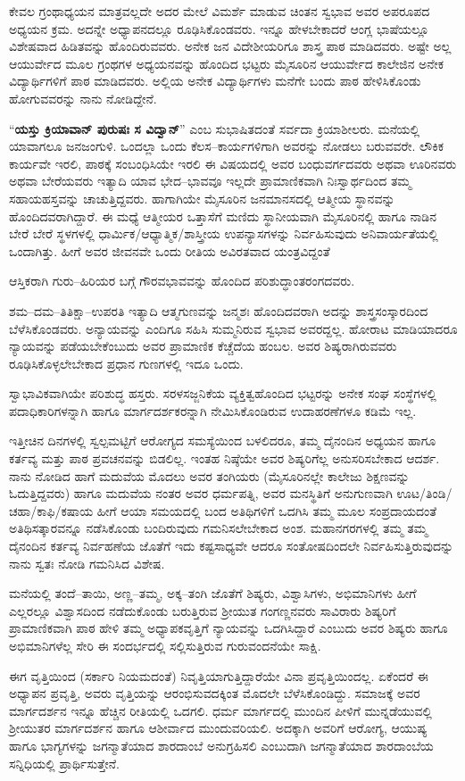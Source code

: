 ಕೇವಲ ಗ್ರಂಥಾಧ್ಯಯನ ಮಾತ್ರವಲ್ಲದೇ ಅದರ ಮೇಲೆ ವಿಮರ್ಶೆ ಮಾಡುವ ಚಿಂತನ ಸ್ವಭಾವ ಅವರ ಅಪರೂಪದ ಅಧ್ಯಯನ ಕ್ರಮ. ಅದನ್ನೇ ಅಧ್ಯಾಪನದಲ್ಲೂ ರೂಢಿಸಿಕೊಂಡವರು. ಇನ್ನೂ ಹೇಳಬೇಕಾದರೆ ಆಂಗ್ಲ ಭಾಷೆಯಲ್ಲೂ ವಿಶೇಷವಾದ ಹಿಡಿತವನ್ನು ಹೊಂದಿರುವವರು. ಅನೇಕ ಜನ ವಿದೇಶೀಯರಿಗೂ ಶಾಸ್ತ್ರ ಪಾಠ ಮಾಡಿದವರು. ಅಷ್ಟೇ ಅಲ್ಲ ಆಯುರ್ವೇದ ಮೂಲ ಗ್ರಂಥಗಳ ಅಧ್ಯಯನವನ್ನು ಹೊಂದಿದ ಭಟ್ಟರು ಮೈಸೂರಿನ ಆಯುರ್ವೇದ ಕಾಲೇಜಿನ ಅನೇಕ ವಿದ್ಯಾರ್ಥಿಗಳಿಗೆ ಪಾಠ ಮಾಡಿದವರು. ಅಲ್ಲಿಯ ಅನೇಕ ವಿದ್ಯಾರ್ಥಿಗಳು ಮನೆಗೇ ಬಂದು ಪಾಠ ಹೇಳಿಸಿಕೊಂಡು ಹೋಗುವವರನ್ನು ನಾನು ನೋಡಿದ್ದೇನೆ.

“\textbf{ಯಸ್ತು ಕ್ರಿಯಾವಾನ್ ಪುರುಷಃ ಸ ವಿದ್ವಾನ್}” ಎಂಬ ಸುಭಾಷಿತದಂತೆ ಸರ್ವದಾ ಕ್ರಿಯಾಶೀಲರು. ಮನೆಯಲ್ಲಿ ಯಾವಾಗಲೂ ಜನಜಂಗುಳಿ. ಒಂದಲ್ಲಾ ಒಂದು ಕೆಲಸ–ಕಾರ್ಯಗಳಿಗಾಗಿ ಅವರನ್ನು ನೋಡಲು ಬರುವವರೇ. ಲೌಕಿಕ ಕಾರ್ಯವೇ ಇರಲಿ, ಪಾಠಕ್ಕೆ ಸಂಬಂಧಿಸಿಯೇ ಇರಲಿ ಈ ವಿಷಯದಲ್ಲಿ ಅವರ ಬಂಧುವರ್ಗದವರು ಅಥವಾ ಊರಿನವರು ಅಥವಾ ಬೇರೆಯವರು ಇತ್ಯಾದಿ ಯಾವ ಭೇದ–ಭಾವವೂ ಇಲ್ಲದೇ ಪ್ರಾಮಾಣಿಕವಾಗಿ ನಿಃಸ್ವಾರ್ಥದಿಂದ ತಮ್ಮ ಸಹಾಯಹಸ್ತವನ್ನು ಚಾಚುತ್ತಿದ್ದವರು. ಹಾಗಾಗಿಯೇ ಮೈಸೂರಿನ ಜನಮಾನಸದಲ್ಲಿ ಆತ್ಮೀಯ ಸ್ಥಾನವನ್ನು ಹೊಂದಿದವರಾಗಿದ್ದಾರೆ. ಈ ಮಧ್ಯೆ ಆತ್ಮೀಯರ ಒತ್ತಾಸೆಗೆ ಮಣಿದು ಸ್ಥಾನೀಯವಾಗಿ ಮೈಸೂರಿನಲ್ಲಿ ಹಾಗೂ ನಾಡಿನ ಬೇರೆ ಬೇರೆ ಸ್ಥಳಗಳಲ್ಲಿ ಧಾರ್ಮಿಕ/ಆಧ್ಯಾತ್ಮಿಕ/ಶಾಸ್ತ್ರೀಯ ಉಪನ್ಯಾಸಗಳನ್ನು ನಿರ್ವಹಿಸುವುದು ಅನಿವಾರ್ಯತೆಯಲ್ಲಿ ಒಂದಾಗಿತ್ತು. ಹೀಗೆ ಅವರ ಜೀವನವೇ ಒಂದು ರೀತಿಯ ಅವಿರತವಾದ ಯಂತ್ರವಿದ್ದಂತೆ

ಆಸ್ತಿಕರಾಗಿ ಗುರು–ಹಿರಿಯರ ಬಗ್ಗೆ ಗೌರವಭಾವವನ್ನು ಹೊಂದಿದ ಪರಿಶುದ್ಧಾಂತರಂಗದವರು. 

ಶಮ–ದಮ–ತಿತಿಕ್ಷಾ–ಉಪರತಿ ಇತ್ಯಾದಿ ಆತ್ಮಗುಣವನ್ನು ಜನ್ಮಶಃ ಹೊಂದಿದವರಾಗಿ ಅದನ್ನು ಶಾಸ್ತ್ರಸಂಸ್ಕಾರದಿಂದ ಬೆಳೆಸಿಕೊಂಡವರು. ಅನ್ಯಾಯವನ್ನು ಎಂದಿಗೂ ಸಹಿಸಿ ಸುಮ್ಮನಿರುವ ಸ್ವಭಾವ ಅವರದ್ದಲ್ಲ. ಹೋರಾಟ ಮಾಡಿಯಾದರೂ ನ್ಯಾಯವನ್ನು ಪಡೆಯಬೇಕೆಂಬುದು ಅವರ ಪ್ರಾಮಾಣಿಕ ಕೆಚ್ಚೆದೆಯ ಹಂಬಲ. ಅವರ ಶಿಷ್ಯರಾಗಿರುವವರು ರೂಢಿಸಿಕೊಳ್ಳಲೇಬೇಕಾದ ಪ್ರಧಾನ ಗುಣಗಳಲ್ಲಿ ಇದೂ ಒಂದು.

ಸ್ವಾಭಾವಿಕವಾಗಿಯೇ ಪರಿಶುದ್ಧ ಹಸ್ತರು. ಸರಳಸಜ್ಜನಿಕೆಯ ವ್ಯಕ್ತಿತ್ವಹೊಂದಿದ ಭಟ್ಟರನ್ನು ಅನೇಕ ಸಂಘ ಸಂಸ್ಥೆಗಳಲ್ಲಿ ಪದಾಧಿಕಾರಿಗಳನ್ನಾಗಿ ಹಾಗೂ ಮಾರ್ಗದರ್ಶಕರನ್ನಾಗಿ ನೇಮಿಸಿಕೊಂಡಿರುವ ಉದಾಹರಣೆಗಳೂ ಕಡಿಮೆ ಇಲ್ಲ.

ಇತ್ತೀಚಿನ ದಿನಗಳಲ್ಲಿ ಸ್ವಲ್ಪಮಟ್ಟಿಗೆ ಆರೋಗ್ಯದ ಸಮಸ್ಯೆಯಿಂದ ಬಳಲಿದರೂ, ತಮ್ಮ ದೈನಂದಿನ ಅಧ್ಯಯನ ಹಾಗೂ ಕರ್ತವ್ಯ ಮತ್ತು ಪಾಠ ಪ್ರವಚನವನ್ನು ಬಿಡಲಿಲ್ಲ. ಇಂತಹ ನಿಷ್ಠೆಯೇ ಅವರ ಶಿಷ್ಯರಿಗೆಲ್ಲ ಅನುಸರಿಸಬೇಕಾದ ಆದರ್ಶ. ನಾನು ನೋಡಿದ ಹಾಗೆ ಮದುವೆಯ ಮೊದಲು ಅವರ ತಂಗಿಯರು (ಮೈಸೂರಿನಲ್ಲೇ ಕಾಲೇಜು ಶಿಕ್ಷಣವನ್ನು ಓದುತ್ತಿದ್ದವರು) ಹಾಗೂ ಮದುವೆಯ ನಂತರ ಅವರ ಧರ್ಮಪತ್ನಿ, ಅವರ ಮನಸ್ಥಿತಿಗೆ ಅನುಗುಣವಾಗಿ ಊಟ/ತಿಂಡಿ/ಚಹಾ/ಕಾಫಿ/ಕಷಾಯ ಹೀಗೆ ಆಯಾ ಸಮಯದಲ್ಲಿ ಬಂದ ಅತಿಥಿಗಳಿಗೆ ಒದಗಿಸಿ ತಮ್ಮ ಮೂಲ ಸಂಪ್ರದಾಯದಂತೆ ಅತಿಥಿಸತ್ಕಾರವನ್ನೂ ನಡೆಸಿಕೊಂಡು ಬಂದಿರುವುದು ಗಮನಿಸಲೇಬೇಕಾದ ಅಂಶ. ಮಹಾನಗರಗಳಲ್ಲಿ ತಮ್ಮ ತಮ್ಮ ದೈನಂದಿನ ಕರ್ತವ್ಯ ನಿರ್ವಹಣೆಯ ಜೊತೆಗೆ ಇದು ಕಷ್ಟಸಾಧ್ಯವೇ ಆದರೂ ಸಂತೋಷದಿಂದಲೇ ನಿರ್ವಹಿಸುತ್ತಿರುವುದನ್ನು ನಾನು ಸ್ವತಃ ನೋಡಿ ಗಮನಿಸಿದ ವಿಶೇಷ.

ಮನೆಯಲ್ಲಿ ತಂದೆ–ತಾಯಿ, ಅಣ್ಣ–ತಮ್ಮ, ಅಕ್ಕ–ತಂಗಿ ಜೊತೆಗೆ ಶಿಷ್ಯರು, ವಿಶ್ವಾಸಿಗಳು, ಅಭಿಮಾನಿಗಳು ಹೀಗೆ ಎಲ್ಲರಲ್ಲೂ ವಿಶ್ವಾಸದಿಂದ ನಡೆದುಕೊಂಡು ಬರುತ್ತಿರುವ ಶ್ರೀಯುತ ಗಂಗಣ್ಣನವರು ಸಾವಿರಾರು ಶಿಷ್ಯರಿಗೆ ಪ್ರಾಮಾಣಿಕವಾಗಿ ಪಾಠ ಹೇಳಿ ತಮ್ಮ ಅಧ್ಯಾಪಕವೃತ್ತಿಗೆ ನ್ಯಾಯವನ್ನು ಒದಗಿಸಿದ್ದಾರೆ ಎಂಬುದು ಅವರ ಶಿಷ್ಯರು ಹಾಗೂ ಅಭಿಮಾನಿಗಳೆಲ್ಲ ಸೇರಿ ಈ ಸಂದರ್ಭದಲ್ಲಿ ಸಲ್ಲಿಸುತ್ತಿರುವ ಗುರುವಂದನೆಯೇ ಸಾಕ್ಷಿ.

ಈಗ ವೃತ್ತಿಯಿಂದ (ಸರ್ಕಾರಿ ನಿಯಮದಂತೆ) ನಿವೃತ್ತಿಯಾಗುತ್ತಿದ್ದಾರೆಯೇ ವಿನಾ ಪ್ರವೃತ್ತಿಯಿಂದಲ್ಲ. ಏಕೆಂದರೆ ಈ ಅಧ್ಯಾಪನ ಪ್ರವೃತ್ತಿ, ಅವರು ವೃತ್ತಿಯನ್ನು ಆರಂಭಿಸುವದಕ್ಕಿಂತ ಮೊದಲೇ ಬೆಳೆಸಿಕೊಂಡಿದ್ದು. ಸಮಾಜಕ್ಕೆ ಅವರ ಮಾರ್ಗದರ್ಶನ ಇನ್ನೂ ಹೆಚ್ಚಿನ ರೀತಿಯಲ್ಲಿ ಒದಗಲಿ. ಧರ್ಮ ಮಾರ್ಗದಲ್ಲಿ ಮುಂದಿನ ಪೀಳಿಗೆ ಮುನ್ನಡೆಯುವಲ್ಲಿ ಶ್ರೀಯುತರ ಮಾರ್ಗದರ್ಶನ ಹಾಗೂ ಆಶೀರ್ವಾದ ಮುಂದುವರಿಯಲಿ. ಅದಕ್ಕಾಗಿ ಅವರಿಗೆ ಆರೋಗ್ಯ, ಆಯುಷ್ಯ ಹಾಗೂ ಭಾಗ್ಯಗಳನ್ನು ಜಗನ್ಮಾತೆಯಾದ ಶಾರದಾಂಬೆ ಅನುಗ್ರಹಿಸಲಿ ಎಂಬುದಾಗಿ ಜಗನ್ಮಾತೆಯಾದ ಶಾರದಾಂಬೆಯ ಸನ್ನಿಧಿಯಲ್ಲಿ ಪ್ರಾರ್ಥಿಸುತ್ತೇನೆ.

\articleend
